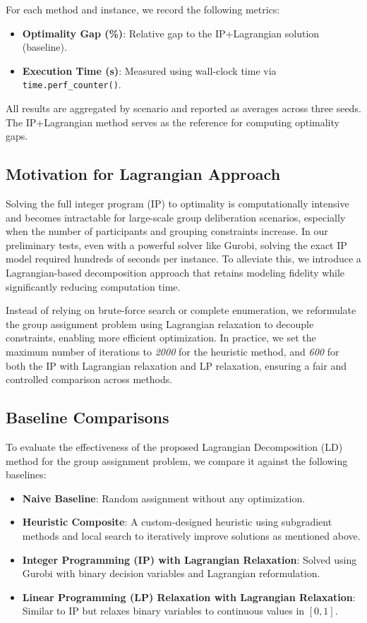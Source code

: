 For each method and instance, we record the following metrics:
\begin{itemize}
    \item \textbf{Optimality Gap (\%)}: Relative gap to the IP+Lagrangian solution (baseline).
    \item \textbf{Execution Time (s)}: Measured using wall-clock time via \texttt{time.perf\_counter()}.
\end{itemize}

All results are aggregated by scenario and reported as averages across three seeds. The IP+Lagrangian method serves as the reference for computing optimality gaps.


\subsection{Motivation for Lagrangian Approach}

Solving the full integer program (IP) to optimality is computationally intensive and becomes intractable for large-scale group deliberation scenarios, especially when the number of participants and grouping constraints increase. In our preliminary tests, even with a powerful solver like Gurobi, solving the exact IP model required hundreds of seconds per instance. To alleviate this, we introduce a Lagrangian-based decomposition approach that retains modeling fidelity while significantly reducing computation time.

Instead of relying on brute-force search or complete enumeration, we reformulate the group assignment problem using Lagrangian relaxation to decouple constraints, enabling more efficient optimization. In practice, we set the maximum number of iterations to \emph{2000} for the heuristic method, and \emph{600} for both the IP with Lagrangian relaxation and LP relaxation, ensuring a fair and controlled comparison across methods.

\subsection{Baseline Comparisons}

To evaluate the effectiveness of the proposed Lagrangian Decomposition (LD) method for the group assignment problem, we compare it against the following baselines:

\begin{itemize}
    \item \textbf{Naive Baseline}: Random assignment without any optimization.
    \item \textbf{Heuristic Composite}: A custom-designed heuristic using subgradient methods and local search to iteratively improve solutions as mentioned above.
    \item \textbf{Integer Programming (IP) with Lagrangian Relaxation}: Solved using Gurobi with binary decision variables and Lagrangian reformulation.
    \item \textbf{Linear Programming (LP) Relaxation with Lagrangian Relaxation}: Similar to IP but relaxes binary variables to continuous values in $[0, 1]$.
\end{itemize}

